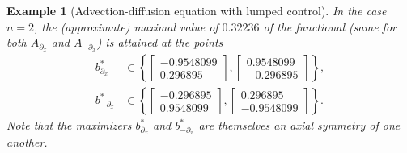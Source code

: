 \documentclass[11pt, a4paper, reqno]{amsart}
\newcommand{\del}{\partial}
\theoremstyle{plain}
\numberwithin{equation}{section}
\newtheorem{example}{Example}[section]
\begin{document}
\begin{example}[Advection-diffusion equation with lumped control]
	In the case $n=2$, the (approximate) maximal value of $0.32236$ of the functional (same for both $A_{\del_x}$ and $A_{-\del_x}$) is attained at the points 
	\begin{align} \label{eq: max.ex.2.1}
	b^*_{\del_x} &\in \left\{\begin{bmatrix}-0.9548099\\0.296895\end{bmatrix}, \begin{bmatrix}0.9548099\\-0.296895\end{bmatrix}\right\}, \nonumber\\
	b^*_{-\del_x} &\in \left\{\begin{bmatrix}-0.296895\\0.9548099\end{bmatrix}, \begin{bmatrix}0.296895\\-0.9548099\end{bmatrix}\right\}.
	\end{align}
	Note that the maximizers $b^*_{\del_x}$ and $b^*_{-\del_x}$ are themselves an axial symmetry of one another. 
	

\end{example}
\end{document}
